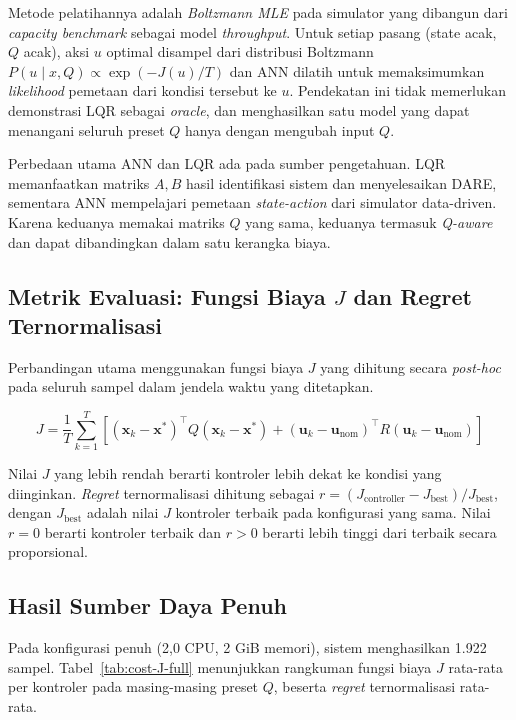 Metode pelatihannya adalah \emph{Boltzmann MLE} pada simulator yang dibangun dari
\emph{capacity benchmark} sebagai model \emph{throughput}. Untuk setiap pasang (state acak,
$Q$ acak), aksi $u$ optimal disampel dari distribusi Boltzmann
$P(u \mid x, Q) \propto \exp(-J(u)/T)$ dan ANN dilatih untuk memaksimumkan \emph{likelihood}
pemetaan dari kondisi tersebut ke $u$. Pendekatan ini tidak memerlukan demonstrasi LQR
sebagai \emph{oracle}, dan menghasilkan satu model yang dapat menangani seluruh preset $Q$
hanya dengan mengubah input $Q$.

Perbedaan utama ANN dan LQR ada pada sumber pengetahuan. LQR memanfaatkan matriks $A,B$
hasil identifikasi sistem dan menyelesaikan DARE, sementara ANN mempelajari pemetaan
\emph{state-action} dari simulator data-driven. Karena keduanya memakai matriks $Q$ yang
sama, keduanya termasuk \emph{Q-aware} dan dapat dibandingkan dalam satu kerangka biaya.

\subsection{Metrik Evaluasi: Fungsi Biaya $J$ dan Regret Ternormalisasi}

Perbandingan utama menggunakan fungsi biaya $J$ yang dihitung secara \emph{post-hoc} pada
seluruh sampel dalam jendela waktu yang ditetapkan.

\begin{equation}
J = \frac{1}{T} \sum_{k=1}^{T} \left[(\mathbf{x}_k - \mathbf{x}^*)^\top Q (\mathbf{x}_k - \mathbf{x}^*) + (\mathbf{u}_k - \mathbf{u}_{\text{nom}})^\top R (\mathbf{u}_k - \mathbf{u}_{\text{nom}})\right]
\end{equation}

Nilai $J$ yang lebih rendah berarti kontroler lebih dekat ke kondisi yang diinginkan.
\emph{Regret} ternormalisasi dihitung sebagai
$r = (J_{\text{controller}} - J_{\text{best}}) / J_{\text{best}}$,
dengan $J_{\text{best}}$ adalah nilai $J$ kontroler terbaik pada konfigurasi yang sama.
Nilai $r = 0$ berarti kontroler terbaik dan $r > 0$ berarti lebih tinggi dari terbaik
secara proporsional.

\subsection{Hasil Sumber Daya Penuh}
\label{sec:hasil-full}

Pada konfigurasi penuh (2{,}0 CPU, 2 GiB memori), sistem menghasilkan 1.922 sampel.
Tabel~\ref{tab:cost-J-full} menunjukkan rangkuman fungsi biaya $J$ rata-rata per kontroler
pada masing-masing preset $Q$, beserta \emph{regret} ternormalisasi rata-rata.

